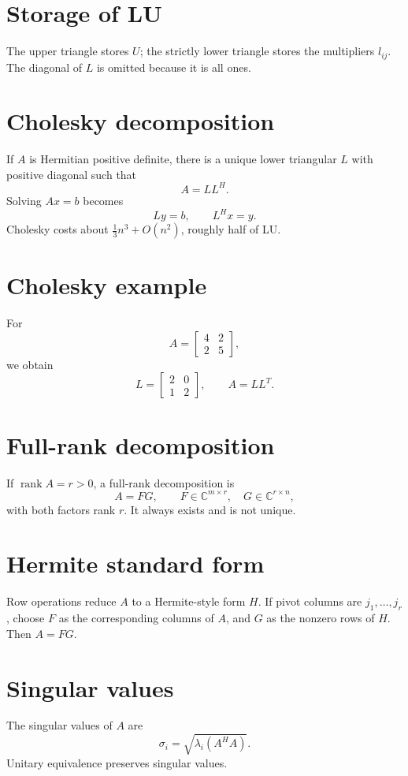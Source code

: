 \section{Storage of LU}
The upper triangle stores \(U\); the strictly lower triangle stores the multipliers \(l_{ij}\).  The diagonal of \(L\) is omitted because it is all ones.

\section{Cholesky decomposition}
If \(A\) is Hermitian positive definite, there is a unique lower triangular \(L\) with positive diagonal such that
\[
  A=LL^H.
\]
Solving \(Ax=b\) becomes
\[
  Ly=b,\qquad L^Hx=y.
\]
Cholesky costs about \(\frac13n^3+O(n^2)\), roughly half of LU.

\section{Cholesky example}
For
\[
  A=\begin{bmatrix}4&2\\2&5\end{bmatrix},
\]
we obtain
\[
  L=\begin{bmatrix}2&0\\1&2\end{bmatrix},\qquad A=LL^T.
\]

\section{Full-rank decomposition}
If \(\operatorname{rank}A=r>0\), a full-rank decomposition is
\[
  A=FG,\qquad F\in\mathbb C^{m\times r},\quad G\in\mathbb C^{r\times n},
\]
with both factors rank \(r\).  It always exists and is not unique.

\section{Hermite standard form}
Row operations reduce \(A\) to a Hermite-style form \(H\).  If pivot columns are \(j_1,\ldots,j_r\), choose \(F\) as the corresponding columns of \(A\), and \(G\) as the nonzero rows of \(H\).  Then \(A=FG\).

\section{Singular values}
The singular values of \(A\) are
\[
  \sigma_i=\sqrt{\lambda_i(A^HA)}.
\]
Unitary equivalence preserves singular values.

